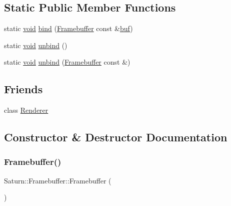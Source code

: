\subsection*{Static Public Member Functions}
\begin{DoxyCompactItemize}
\item 
static \mbox{\hyperlink{glad_8h_a950fc91edb4504f62f1c577bf4727c29}{void}} \mbox{\hyperlink{class_saturn_1_1_framebuffer_a8f941c194cd385c6843aee2668f583ff}{bind}} (\mbox{\hyperlink{class_saturn_1_1_framebuffer}{Framebuffer}} const \&\mbox{\hyperlink{glad_8h_af334395038ceaf0522a53f75e6fd2b1f}{buf}})
\item 
static \mbox{\hyperlink{glad_8h_a950fc91edb4504f62f1c577bf4727c29}{void}} \mbox{\hyperlink{class_saturn_1_1_framebuffer_a57a7e2d21dd704393dcc7718302203ab}{unbind}} ()
\item 
static \mbox{\hyperlink{glad_8h_a950fc91edb4504f62f1c577bf4727c29}{void}} \mbox{\hyperlink{class_saturn_1_1_framebuffer_a3f77bf8b43788d5c93af0f0f1c1ef904}{unbind}} (\mbox{\hyperlink{class_saturn_1_1_framebuffer}{Framebuffer}} const \&)
\end{DoxyCompactItemize}
\subsection*{Friends}
\begin{DoxyCompactItemize}
\item 
class \mbox{\hyperlink{class_saturn_1_1_framebuffer_a70538530bc36e033e360880ef311df61}{Renderer}}
\end{DoxyCompactItemize}


\subsection{Constructor \& Destructor Documentation}
\mbox{\label{class_saturn_1_1_framebuffer_afae1e890e24c1d1f93fb5393e44449d7}} 
\subsubsection{\texorpdfstring{Framebuffer()}{Framebuffer()}\hspace{0.1cm}{\footnotesize\ttfamily [1/3]}}
{\footnotesize\ttfamily Saturn\+::\+Framebuffer\+::\+Framebuffer (\begin{DoxyParamCaption}{ }\end{DoxyParamCaption})\hspace{0.3cm}{\ttfamily [default]}}

